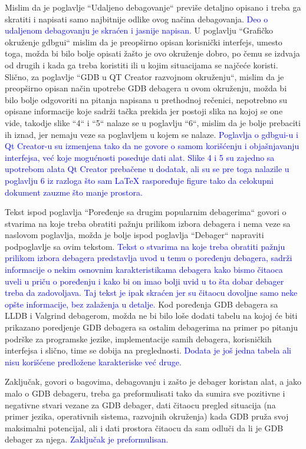\documentclass[a4paper]{report}
\newcommand{\odgovor}[1]{\textcolor{blue}{#1}}
\begin{document}
Mislim da je poglavlje ``Udaljeno debagovanje`` previše detaljno opisano i treba ga skratiti i napisati samo najbitnije odlike ovog načina debagovanja. \odgovor{Deo o udaljenom debagovanju je skraćen i jasnije napisan.} U poglavlju ``Grafičko okruženje gdbgui`` mislim da je preopširno opisan korisnički interfejs, umesto toga, možda bi bilo bolje opisati žašto je ovo okruženje dobro, po čemu se izdvaja od drugih i kada ga treba koristiti ili u kojim situacijama se najčeće koristi. Slično, za poglavlje ``GDB u QT Creator razvojnom okruženju``, mislim da je preopširno opisan način upotrebe GDB debagera u ovom okruženju, možda bi bilo bolje odgovoriti na pitanja napisana u prethodnoj rečenici, nepotrebno su opisane informacije koje sadrži tačka prekida jer postoji slika na kojoj se one vide, takodje slike ``4`` i ``5`` nalaze se u poglavlju ``6``, mislim da je bolje prebaciti ih iznad, jer nemaju veze sa poglavljem u kojem se nalaze.
\odgovor{Poglavlja o gdbgui-u i Qt Creator-u su izmenjena tako da ne govore o samom korišćenju i objašnjavanju interfejsa, već koje mogućnosti poseduje dati alat. Slike 4 i 5 su zajedno
sa upotrebom alata Qt Creator prebačene u dodatak, ali su se pre toga nalazile u poglavlju 6 iz razloga što sam \LaTeX {} raspoređuje figure tako da celokupni dokument zauzme što manje 
prostora.}

Tekst ispod poglavlja ``Poređenje sa drugim popularnim debagerima`` govori o stvarima na koje treba obratiti pažnju prilikom izbora debagera i nema veze sa naslovom poglavlja, možda je bolje ispod poglavlja ``Debager`` napraviti podpoglavlje sa ovim tekstom. \odgovor{Tekst o stvarima na koje treba obratiti pažnju prilikom izbora debagera predstavlja uvod u temu o poređenju debagera, sadrži informacije o nekim osnovnim karakteristikama debagera kako bismo čitaoca uveli u priču o poređenju i kako bi on imao bolji uvid u to šta dobar debager treba da zadovoljava. Taj tekst je ipak skraćen jer su čitaocu dovoljne samo neke opšte informacije, bez zalaženja u detalje.} Kod poređenja GDB debagera sa LLDB i Valgrind debagerom, možda ne bi bilo loše dodati tabelu na kojoj će biti prikazano poredjenje GDB debagera sa ostalim debagerima na primer po pitanju podrške za programske jezike, implementacije samih debagera, korisničkih interfejsa i slično, time se dobija na preglednosti. 
\odgovor{Dodata je još jedna tabela ali nisu korišćene predložene karakteriske već druge.} 

Zaključak, govori o bagovima, debagovanju i zašto je debager koristan alat, a jako malo o GDB debageru, treba ga preformulisati tako da sumira sve pozitivne i negativne stvari vezane za GDB debager, dati čitaocu pregled situacija (na primer jezika, operativnih sistema, razvojnih okruženja) kada GDB pruža svoj maksimalni potencijal, ali i dati prostora čitaocu da sam odluči da li je GDB debager za njega.
\odgovor{Zaključak je preformulisan.} 
\end{document}
